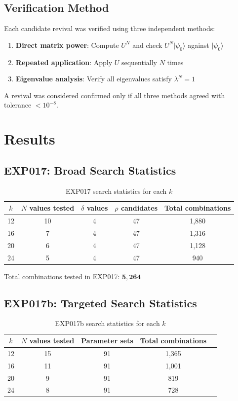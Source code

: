 \documentclass[12pt]{article}
\begin{document}
\subsection{Verification Method}

Each candidate revival was verified using three independent methods:
\begin{enumerate}
    \item \textbf{Direct matrix power}: Compute $U^N$ and check $U^N|\psi_0\rangle$ against $|\psi_0\rangle$
    \item \textbf{Repeated application}: Apply $U$ sequentially $N$ times
    \item \textbf{Eigenvalue analysis}: Verify all eigenvalues satisfy $\lambda^N = 1$
\end{enumerate}

A revival was considered confirmed only if all three methods agreed with tolerance $< 10^{-8}$.

\section{Results}

\subsection{EXP017: Broad Search Statistics}

\begin{table}[H]
\centering
\caption{EXP017 search statistics for each $k$}
\label{tab:stats}
\begin{tabular}{ccccc}
\toprule
$k$ & $N$ values tested & $\delta$ values & $\rho$ candidates & Total combinations \\
\midrule
12 & 10 & 4 & 47 & 1,880 \\
16 & 7 & 4 & 47 & 1,316 \\
20 & 6 & 4 & 47 & 1,128 \\
24 & 5 & 4 & 47 & 940 \\
\bottomrule
\end{tabular}
\end{table}

Total combinations tested in EXP017: $\mathbf{5,264}$

\subsection{EXP017b: Targeted Search Statistics}

\begin{table}[H]
\centering
\caption{EXP017b search statistics for each $k$}
\label{tab:stats2}
\begin{tabular}{ccccc}
\toprule
$k$ & $N$ values tested & Parameter sets & Total combinations \\
\midrule
12 & 15 & 91 & 1,365 \\
16 & 11 & 91 & 1,001 \\
20 & 9 & 91 & 819 \\
24 & 8 & 91 & 728 \\
\bottomrule
\end{tabular}
\end{table}
\end{document}
